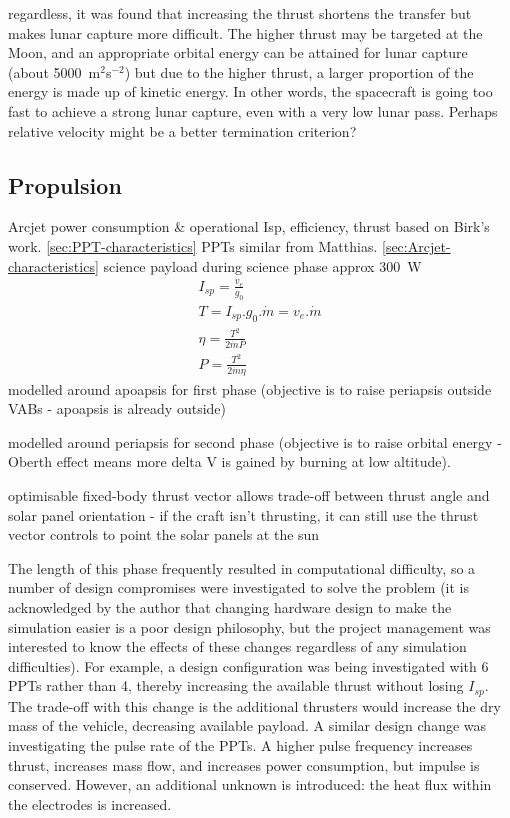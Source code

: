 regardless, it was found that increasing the thrust shortens the transfer but makes lunar capture more difficult. The higher thrust may be targeted at the Moon, and an appropriate orbital energy can be attained for lunar capture (about 5000~m$^2$s$^{-2}$) but due to the higher thrust, a larger proportion of the energy is made up of kinetic energy. In other words, the spacecraft is going too fast to achieve a strong lunar capture, even with a very low lunar pass. Perhaps relative velocity might be a better termination criterion?

\subsection{Propulsion}
Arcjet power consumption \& operational Isp, efficiency, thrust based on Birk's work. \autoref{sec:PPT-characteristics}
PPTs similar from Matthias. \autoref{sec:Arcjet-characteristics}
science payload during science phase approx 300~W \parencite{web_BW-1}
\begin{gather}
I_{sp} = \frac{v_e}{g_0} \\
T = I_{sp}.g_0.\dot{m} = v_e.\dot{m} \\
\eta = \frac{T^2}{2\dot{m}P} \\
P = \frac{T^2}{2\dot{m}\eta} 
\end{gather}
modelled around apoapsis for first phase (objective is to raise periapsis outside VABs - apoapsis is already outside)

modelled around periapsis for second phase (objective is to raise orbital energy - Oberth effect means more delta V is gained by burning at low altitude).

optimisable fixed-body thrust vector allows trade-off between thrust angle and solar panel orientation - if the craft isn't thrusting, it can still use the thrust vector controls to point the solar panels at the sun


The length of this phase frequently resulted in computational difficulty, so a number of design compromises were investigated to solve the problem (it is acknowledged by the author that changing hardware design to make the simulation easier is a poor design philosophy, but the project management was interested to know the effects of these changes regardless of any simulation difficulties). For example, a design configuration was being investigated with 6 PPTs rather than 4, thereby increasing the available thrust without losing $I_{sp}$. The trade-off with this change is the additional thrusters would increase the dry mass of the vehicle, decreasing available payload. A similar design change was investigating the pulse rate of the PPTs. A higher pulse frequency increases thrust, increases mass flow, and increases power consumption, but impulse is conserved. However, an additional unknown is introduced: the heat flux within the electrodes is increased. 

